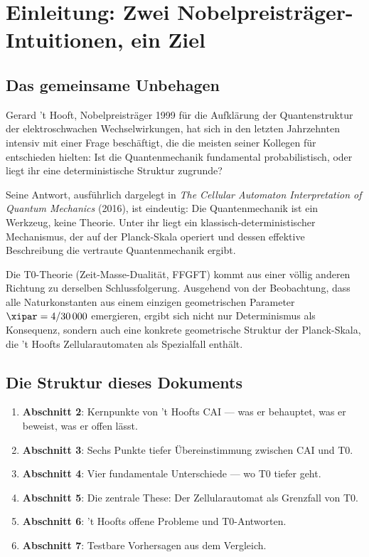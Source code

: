 \section{Einleitung: Zwei Nobelpreisträger-Intuitionen, ein Ziel}
\label{sec:intro}

\subsection{Das gemeinsame Unbehagen}

Gerard 't Hooft, Nobelpreisträger 1999 für die Aufklärung der Quantenstruktur der
elektroschwachen Wechselwirkungen, hat sich in den letzten Jahrzehnten intensiv mit
einer Frage beschäftigt, die die meisten seiner Kollegen für entschieden hielten:
Ist die Quantenmechanik fundamental probabilistisch, oder liegt ihr eine
deterministische Struktur zugrunde?

Seine Antwort, ausführlich dargelegt in \emph{The Cellular Automaton Interpretation
of Quantum Mechanics} (2016), ist eindeutig: Die Quantenmechanik ist ein Werkzeug,
keine Theorie. Unter ihr liegt ein klassisch-deterministischer Mechanismus, der auf
der Planck-Skala operiert und dessen effektive Beschreibung die vertraute
Quantenmechanik ergibt.

Die T0-Theorie (Zeit-Masse-Dualität, FFGFT) kommt aus einer völlig anderen Richtung
zu derselben Schlussfolgerung. Ausgehend von der Beobachtung, dass alle
Naturkonstanten aus einem einzigen geometrischen Parameter $\xipar = 4/30\,000$
emergieren, ergibt sich nicht nur Determinismus als Konsequenz, sondern auch eine
konkrete geometrische Struktur der Planck-Skala, die 't Hoofts Zellularautomaten
als Spezialfall enthält.

\subsection{Die Struktur dieses Dokuments}

\begin{enumerate}
    \item \textbf{Abschnitt 2}: Kernpunkte von 't Hoofts CAI — was er behauptet,
    was er beweist, was er offen lässt.
    \item \textbf{Abschnitt 3}: Sechs Punkte tiefer Übereinstimmung zwischen CAI
    und T0.
    \item \textbf{Abschnitt 4}: Vier fundamentale Unterschiede — wo T0 tiefer geht.
    \item \textbf{Abschnitt 5}: Die zentrale These: Der Zellularautomat als
    Grenzfall von T0.
    \item \textbf{Abschnitt 6}: 't Hoofts offene Probleme und T0-Antworten.
    \item \textbf{Abschnitt 7}: Testbare Vorhersagen aus dem Vergleich.
\end{enumerate}


